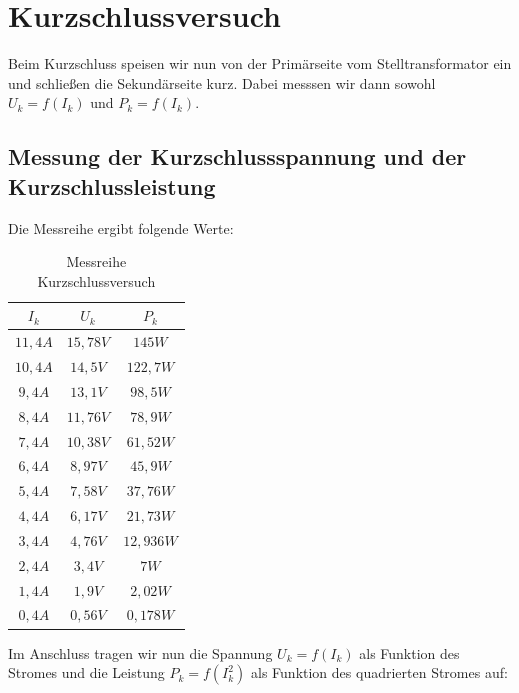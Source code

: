 \documentclass{article}
\begin{document}
\section{Kurzschlussversuch}
\label{sec:kurzschlussversuch}

Beim Kurzschluss speisen wir nun von der Primärseite vom Stelltransformator ein und schließen die Sekundärseite kurz. Dabei messsen wir dann sowohl $U_{k} = f(I_{k})$ und $P_{k} = f(I_{k})$.

\subsection{Messung der Kurzschlussspannung und der Kurzschlussleistung}
\label{sec:mess-der-kurzschl}

Die Messreihe ergibt folgende Werte:

\begin{table}[h]
  \centering
  \begin{tabular}{|c|c|c|}
    \hline
    $I_{k}$ & $U_{k}$ & $P_{k}$ \\
    \hline
    $11,4A$ & $15,78V$ & $145W$ \\
    \hline
    $10,4A$ & $14,5V$ & $122,7W$ \\
    \hline
    $9,4A$ & $13,1V$ & $98,5W$ \\
    \hline
    $8,4A$ & $11,76V$ & $78,9W$ \\
    \hline
    $7,4A$ & $10,38V$ & $61,52W$\\
    \hline
    $6,4A$ & $8,97V$ & $45,9W$\\
    \hline
    $5,4A$ & $7,58V$ & $37,76W$\\
    \hline
    $4,4A$ & $6,17V$ & $21,73W$\\
    \hline
    $3,4A$ & $4,76V$ & $12,936W$\\
    \hline
    $2,4A$ & $3,4V$ & $7W$ \\
    \hline
    $1,4A$ & $1,9V$ & $2,02W$ \\
    \hline
    $0,4A$ & $0,56V$ & $0,178W$\\
    \hline
  \end{tabular}
  \caption{Messreihe Kurzschlussversuch}
  \label{tab:messkurz}
\end{table}

Im Anschluss tragen wir nun die Spannung $U_{k} = f(I_{k})$ als Funktion des Stromes und die Leistung $P_{k} = f(I_{k}^{2})$ als Funktion des quadrierten Stromes auf:
\end{document}
